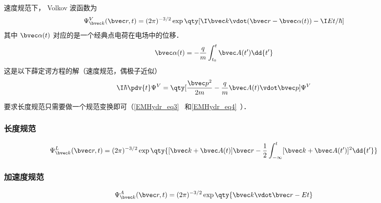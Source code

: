 
\begin{issues}
\issueDraft
\issueMissDepend
\end{issues}

速度规范下， Volkov 波函数为
 \begin{equation}
\Psi_{\bvec k}^V(\bvec r, t) = (2\pi)^{-3/2} \exp\qty[\I \bvec k \vdot (\bvec r - \bvec \alpha(t)) - \I Et/\hbar]
\end{equation}
其中 $\bvec \alpha(t)$ 对应的是一个经典点电荷在电场中的位移．
\begin{equation}
\bvec \alpha(t) = -\frac{q}{m} \int_{t_0}^t \bvec A(t') \dd{t'}
\end{equation}
这是以下薛定谔方程的解（速度规范，偶极子近似）
\begin{equation}
\I\hbar \pdv{t} \Psi^V = \qty[\frac{\bvec p^2}{2m} - \frac{q}{m}\bvec A(t) \vdot \bvec p] \Psi^V
\end{equation}

要求长度规范只需要做一个规范变换即可（\autoref{EMHydr_eq3}~ 和\autoref{EMHydr_eq4}~）．

\subsubsection{长度规范}
\begin{equation}
\Psi_{\bvec k}^L(\bvec r, t) = (2\pi)^{-3/2} \exp\qty{[\bvec k + \bvec A(t)]\bvec r - \frac{1}{2}\int_{-\infty}^t [\bvec k + \bvec A(t')]^2 \dd{t'}}
\end{equation}

\subsubsection{加速度规范}
\begin{equation}
\Psi_{\bvec k}^A(\bvec r, t) = (2\pi)^{-3/2} \exp\qty{\bvec k \vdot \bvec r - Et}
\end{equation}
